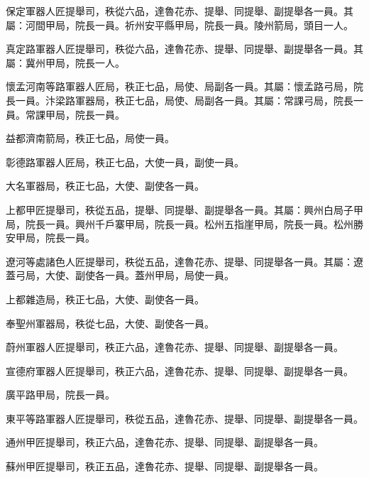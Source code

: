 \begin{pinyinscope}
 保定軍器人匠提舉司，秩從六品，達魯花赤、提舉、同提舉、副提舉各一員。其屬：河間甲局，院長一員。祈州安平縣甲局，院長一員。陵州箭局，頭目一人。



 真定路軍器人匠提舉司，秩從六品，達魯花赤、提舉、同提舉、副提舉各一員。其屬：冀州甲局，院長一人。



 懷孟河南等路軍器人匠局，秩正七品，局使、局副各一員。其屬：懷孟路弓局，院長一員。汴梁路軍器局，秩正七品，局使、局副各一員。其屬：常課弓局，院長一員。常課甲局，院長一員。



 益都濟南箭局，秩正七品，局使一員。



 彰德路軍器人匠局，秩正七品，大使一員，副使一員。



 大名軍器局，秩正七品，大使、副使各一員。



 上都甲匠提舉司，秩從五品，提舉、同提舉、副提舉各一員。其屬：興州白局子甲局，院長一員。興州千戶寨甲局，院長一員。松州五指崖甲局，院長一員。松州勝安甲局，院長一員。



 遼河等處諸色人匠提舉司，秩從五品，達魯花赤、提舉、同提舉各一員。其屬：遼蓋弓局，大使、副使各一員。蓋州甲局，局使一員。



 上都雜造局，秩正七品，大使、副使各一員。



 奉聖州軍器局，秩從七品，大使、副使各一員。



 蔚州軍器人匠提舉司，秩正六品，達魯花赤、提舉、同提舉、副提舉各一員。



 宣德府軍器人匠提舉司，秩正六品，達魯花赤、提舉、同提舉、副提舉各一員。



 廣平路甲局，院長一員。



 東平等路軍器人匠提舉司，秩從五品，達魯花赤、提舉、同提舉、副提舉各一員。



 通州甲匠提舉司，秩正六品，達魯花赤、提舉、同提舉、副提舉各一員。



 蘇州甲匠提舉司，秩正五品，達魯花赤、提舉、同提舉、副提舉各一員。




\end{pinyinscope}
